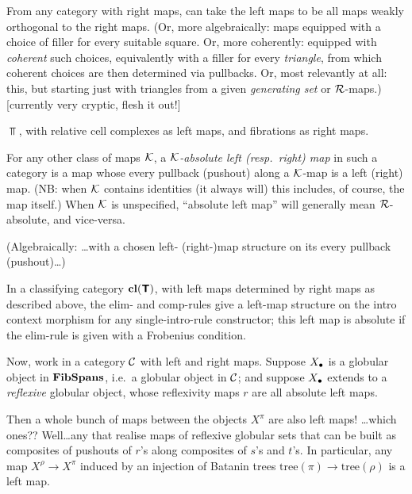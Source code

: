 \documentclass{amsart}
\newcommand{\tr}{\mathrm{tree}}
\begin{document}
\begin{example} \cite{ex:left-maps-from-right} From any category with right maps, can take the left maps to be all maps weakly orthogonal to the right maps.  (Or, more algebraically: maps equipped with a choice of filler for every suitable square.  Or, more coherently: equipped with \emph{coherent} such choices, equivalently with a filler for every \emph{triangle}, from which coherent choices are then determined via pullbacks.  Or, most relevantly at all: this, but starting just with triangles from a given \emph{generating set} or $\mathcal{R}$-maps.) [currently very cryptic, flesh it out!]
\end{example}

\begin{example}$\Top$, with relative cell complexes as left maps, and fibrations as right maps.
\end{example}

\begin{definition}For any other class of maps $\mathcal{K}$, a \emph{$\mathcal{K}$-absolute left (resp.\ right) map} in such a category is a map whose every pullback (pushout) along a $\mathcal{K}$-map is a left (right) map.  (NB: when $\mathcal{K}$ contains identities (it always will) this includes, of course, the map itself.)  When $\mathcal{K}$ is unspecified, ``absolute left map'' will generally mean $\mathcal{R}$-absolute, and vice-versa.

(Algebraically: \ldots with a chosen left- (right-)map structure on its every pullback (pushout)\ldots)  
\end{definition}

\begin{example}In a classifying category $\mathbf{cl}(\textbf{\textsf{T}})$, with left maps determined by right maps as described above, the elim- and comp-rules give a left-map structure on the intro context morphism for any single-intro-rule constructor; this left map is absolute if the elim-rule is given with a Frobenius condition.
\end{example}

Now, work in a category $\mathcal{C}$ with left and right maps.  Suppose $X_\bullet$ is a globular object in $\mathbf{FibSpans}$, i.e.\ a globular object in $\mathcal{C}$; and suppose $X_\bullet$ extends to a \emph{reflexive} globular object, whose reflexivity maps $r$ are all absolute left maps.

Then a whole bunch of maps between the objects $X^\pi$ are also left maps!  \ldots which ones??  Well\ldots any that realise maps of reflexive globular sets that can be built as composites of pushouts of $r$'s along composites of $s$'s and $t$'s.  In particular, any map $X^\rho \to X^\pi$ induced by an injection of Batanin trees $\tr(\pi) \to \tr(\rho)$ is a left map.
\end{document}
